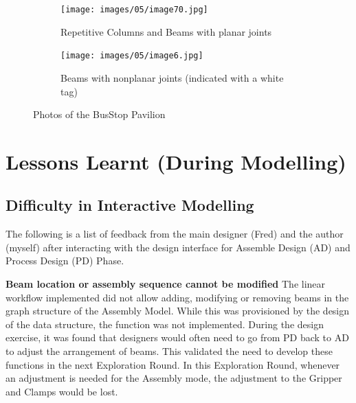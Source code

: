 \begin{figure}
    \centering
    \begin{subfigure}[b]{0.49\textwidth}
        \centering
        \texttt{[image: images/05/image70.jpg]}
        \caption{Repetitive Columns and Beams with planar joints}
        \label{fig:photo-busstop-planar-joints}
    \end{subfigure}
    \hfill
    \begin{subfigure}[b]{0.49\textwidth}
        \centering
        \texttt{[image: images/05/image6.jpg]}
        \caption{Beams with nonplanar joints (indicated with a white tag)}  
        \label{fig:photo-busstop-nonplanar-joints}
    \end{subfigure}
    \caption{Photos of the BusStop Pavilion}
    \label{fig:photo-busstop-joints}
\end{figure}

\FloatBarrier

\section{Lessons Learnt (During Modelling)}
\label{section:exploration-2-lessons-learnt-during-modelling}

\subsection{Difficulty in Interactive Modelling}
\label{subsection:exploration-2-difficulty-in-interactive-modelling}

The following is a list of feedback from the main designer (Fred) and the author (myself) after interacting with the design interface for Assemble Design (AD) and Process Design (PD) Phase.

\textbf{Beam location or assembly sequence cannot be modified} The linear workflow implemented did not allow adding, modifying or removing beams in the graph structure of the Assembly Model. While this was provisioned by the design of the data structure, the function was not implemented. During the design exercise, it was found that designers would often need to go from PD back to AD to adjust the arrangement of beams. This validated the need to develop these functions in the next Exploration Round.  In this Exploration Round, whenever an adjustment is needed for the Assembly mode, the adjustment to the Gripper and Clamps would be lost.

